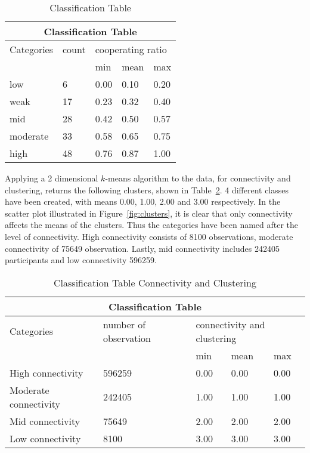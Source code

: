 \begin{table}[H]
	\centering
	\begin{adjustbox}{width=0.4\textwidth}
		\small
		\begin{tabular}{|l|l|l|l|l|}
			\hline
			\multicolumn{5}{|c|}{Classification Table}                        \\ \hline
			Categories & count & \multicolumn{3}{l|}{cooperating ratio}        \\ \hline
			         &    & min  & mean & max  \\ \hline
			low      & 6  & 0.00 & 0.10 & 0.20 \\ \hline
			weak     & 17 & 0.23 & 0.32 & 0.40 \\ \hline
			mid      & 28 & 0.42 & 0.50 & 0.57 \\ \hline
			moderate & 33 & 0.58 & 0.65 & 0.75 \\ \hline
			high     & 48 & 0.76 & 0.87 & 1.00 \\ \hline
		\end{tabular}
	\end{adjustbox}
	\caption{Classification Table}
	\label{table:class}
\end{table}

Applying a 2 dimensional \(k\)-means algorithm to the data, for connectivity and
clustering, returns the following clusters, shown in Table~\ref{table:clusters}.
4 different classes have been created, with means 0.00, 1.00, 2.00 and 3.00 respectively.
In the scatter plot illustrated in Figure~\ref{fig:clusters}, it is clear that only connectivity
affects the means of the clusters. Thus the categories have been named after
the level of connectivity. High connectivity consists of 8100 observations,
moderate connectivity of 75649 observation. Lastly, mid connectivity includes
242405 participants and low connectivity 596259.

\begin{table}[!hbtp]
	\centering
	\begin{adjustbox}{width=0.5\textwidth}
		\small
		\begin{tabular}{|l|l|l|l|l|}
			\hline
			\multicolumn{5}{|c|}{Classification Table} \\ \hline
			Categories & number of observation & \multicolumn{3}{l|}{connectivity and clustering} \\ \hline
			                      &        & min  & mean & max  \\ \hline
			High connectivity     & 596259 & 0.00 & 0.00 & 0.00 \\ \hline
			Moderate connectivity & 242405 & 1.00 & 1.00 & 1.00 \\ \hline
			Mid connectivity      & 75649  & 2.00 & 2.00 & 2.00 \\ \hline
			Low connectivity      & 8100   & 3.00 & 3.00 & 3.00 \\ \hline
		\end{tabular}
	\end{adjustbox}
	\caption{Classification Table Connectivity and Clustering}
	\label{table:clusters}
\end{table}


